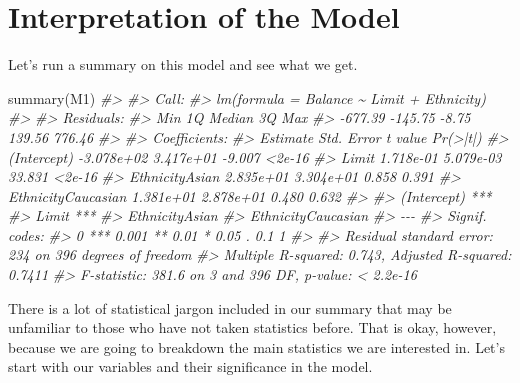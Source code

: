 \documentclass[
]{book}
\newenvironment{Shaded}{\begin{snugshade}}{\end{snugshade}}
\newcommand{\CommentTok}[1]{\textcolor[rgb]{0.56,0.35,0.01}{\textit{#1}}}
\newcommand{\FunctionTok}[1]{\textcolor[rgb]{0.00,0.00,0.00}{#1}}
\newcommand{\NormalTok}[1]{#1}
\begin{document}
\hypertarget{interpretation-of-the-model}{%
\section{Interpretation of the Model}\label{interpretation-of-the-model}}

Let's run a summary on this model and see what we get.

\begin{Shaded}
\begin{Highlighting}[]
\FunctionTok{summary}\NormalTok{(M1)}
\CommentTok{\#\textgreater{} }
\CommentTok{\#\textgreater{} Call:}
\CommentTok{\#\textgreater{} lm(formula = Balance \textasciitilde{} Limit + Ethnicity)}
\CommentTok{\#\textgreater{} }
\CommentTok{\#\textgreater{} Residuals:}
\CommentTok{\#\textgreater{}     Min      1Q  Median      3Q     Max }
\CommentTok{\#\textgreater{} {-}677.39 {-}145.75   {-}8.75  139.56  776.46 }
\CommentTok{\#\textgreater{} }
\CommentTok{\#\textgreater{} Coefficients:}
\CommentTok{\#\textgreater{}                      Estimate Std. Error t value Pr(\textgreater{}|t|)}
\CommentTok{\#\textgreater{} (Intercept)        {-}3.078e+02  3.417e+01  {-}9.007   \textless{}2e{-}16}
\CommentTok{\#\textgreater{} Limit               1.718e{-}01  5.079e{-}03  33.831   \textless{}2e{-}16}
\CommentTok{\#\textgreater{} EthnicityAsian      2.835e+01  3.304e+01   0.858    0.391}
\CommentTok{\#\textgreater{} EthnicityCaucasian  1.381e+01  2.878e+01   0.480    0.632}
\CommentTok{\#\textgreater{}                       }
\CommentTok{\#\textgreater{} (Intercept)        ***}
\CommentTok{\#\textgreater{} Limit              ***}
\CommentTok{\#\textgreater{} EthnicityAsian        }
\CommentTok{\#\textgreater{} EthnicityCaucasian    }
\CommentTok{\#\textgreater{} {-}{-}{-}}
\CommentTok{\#\textgreater{} Signif. codes:  }
\CommentTok{\#\textgreater{} 0 \textquotesingle{}***\textquotesingle{} 0.001 \textquotesingle{}**\textquotesingle{} 0.01 \textquotesingle{}*\textquotesingle{} 0.05 \textquotesingle{}.\textquotesingle{} 0.1 \textquotesingle{} \textquotesingle{} 1}
\CommentTok{\#\textgreater{} }
\CommentTok{\#\textgreater{} Residual standard error: 234 on 396 degrees of freedom}
\CommentTok{\#\textgreater{} Multiple R{-}squared:  0.743,  Adjusted R{-}squared:  0.7411 }
\CommentTok{\#\textgreater{} F{-}statistic: 381.6 on 3 and 396 DF,  p{-}value: \textless{} 2.2e{-}16}
\end{Highlighting}
\end{Shaded}

There is a lot of statistical jargon included in our summary that may be unfamiliar to those who have not taken statistics before. That is okay, however, because we are going to breakdown the main statistics we are interested in. Let's start with our variables and their significance in the model.
\end{document}
